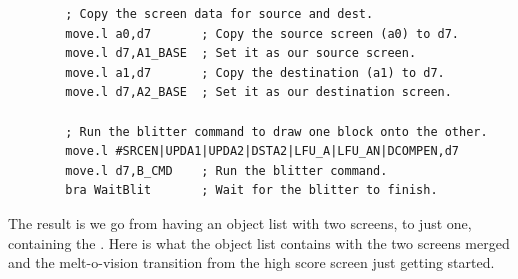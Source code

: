 \begin{lstlisting}
        ; Copy the screen data for source and dest.
        move.l a0,d7       ; Copy the source screen (a0) to d7.
        move.l d7,A1_BASE  ; Set it as our source screen.
        move.l a1,d7       ; Copy the destination (a1) to d7.
        move.l d7,A2_BASE  ; Set it as our destination screen.
    
        ; Run the blitter command to draw one block onto the other.
        move.l #SRCEN|UPDA1|UPDA2|DSTA2|LFU_A|LFU_AN|DCOMPEN,d7
        move.l d7,B_CMD    ; Run the blitter command.
        bra WaitBlit       ; Wait for the blitter to finish.
\end{lstlisting}
\clearpage
The result is we go from having an object list with two screens, to just one, containing the
. Here is what the object list contains with the two screens merged
and the melt-o-vision transition from the high score screen just getting started.

